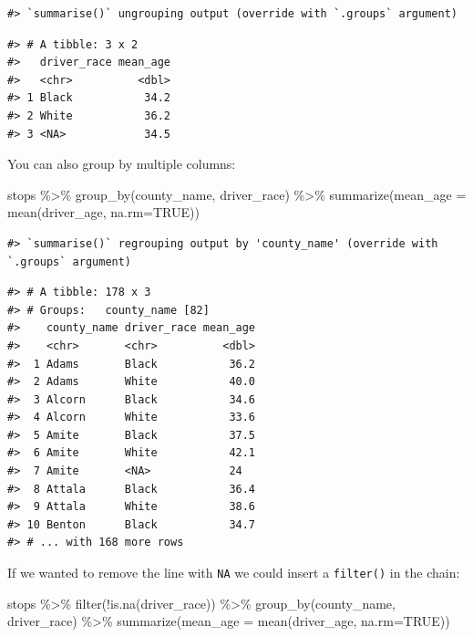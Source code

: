 \documentclass[
]{book}
\newenvironment{Shaded}{\begin{snugshade}}{\end{snugshade}}
\newcommand{\AttributeTok}[1]{\textcolor[rgb]{0.77,0.63,0.00}{#1}}
\newcommand{\ConstantTok}[1]{\textcolor[rgb]{0.00,0.00,0.00}{#1}}
\newcommand{\FunctionTok}[1]{\textcolor[rgb]{0.00,0.00,0.00}{#1}}
\newcommand{\NormalTok}[1]{#1}
\newcommand{\SpecialCharTok}[1]{\textcolor[rgb]{0.00,0.00,0.00}{#1}}
\begin{document}
\begin{verbatim}
#> `summarise()` ungrouping output (override with `.groups` argument)
\end{verbatim}

\begin{verbatim}
#> # A tibble: 3 x 2
#>   driver_race mean_age
#>   <chr>          <dbl>
#> 1 Black           34.2
#> 2 White           36.2
#> 3 <NA>            34.5
\end{verbatim}

You can also group by multiple columns:

\begin{Shaded}
\begin{Highlighting}[]
\NormalTok{stops }\SpecialCharTok{\%\textgreater{}\%} 
  \FunctionTok{group\_by}\NormalTok{(county\_name, driver\_race) }\SpecialCharTok{\%\textgreater{}\%}
  \FunctionTok{summarize}\NormalTok{(}\AttributeTok{mean\_age =} \FunctionTok{mean}\NormalTok{(driver\_age, }\AttributeTok{na.rm=}\ConstantTok{TRUE}\NormalTok{))}
\end{Highlighting}
\end{Shaded}

\begin{verbatim}
#> `summarise()` regrouping output by 'county_name' (override with `.groups` argument)
\end{verbatim}

\begin{verbatim}
#> # A tibble: 178 x 3
#> # Groups:   county_name [82]
#>    county_name driver_race mean_age
#>    <chr>       <chr>          <dbl>
#>  1 Adams       Black           36.2
#>  2 Adams       White           40.0
#>  3 Alcorn      Black           34.6
#>  4 Alcorn      White           33.6
#>  5 Amite       Black           37.5
#>  6 Amite       White           42.1
#>  7 Amite       <NA>            24  
#>  8 Attala      Black           36.4
#>  9 Attala      White           38.6
#> 10 Benton      Black           34.7
#> # ... with 168 more rows
\end{verbatim}

If we wanted to remove the line with \texttt{NA} we could insert a \texttt{filter()} in the chain:

\begin{Shaded}
\begin{Highlighting}[]
\NormalTok{stops }\SpecialCharTok{\%\textgreater{}\%}
  \FunctionTok{filter}\NormalTok{(}\SpecialCharTok{!}\FunctionTok{is.na}\NormalTok{(driver\_race)) }\SpecialCharTok{\%\textgreater{}\%} 
  \FunctionTok{group\_by}\NormalTok{(county\_name, driver\_race) }\SpecialCharTok{\%\textgreater{}\%}
  \FunctionTok{summarize}\NormalTok{(}\AttributeTok{mean\_age =} \FunctionTok{mean}\NormalTok{(driver\_age, }\AttributeTok{na.rm=}\ConstantTok{TRUE}\NormalTok{))}
\end{Highlighting}
\end{Shaded}
\end{document}
